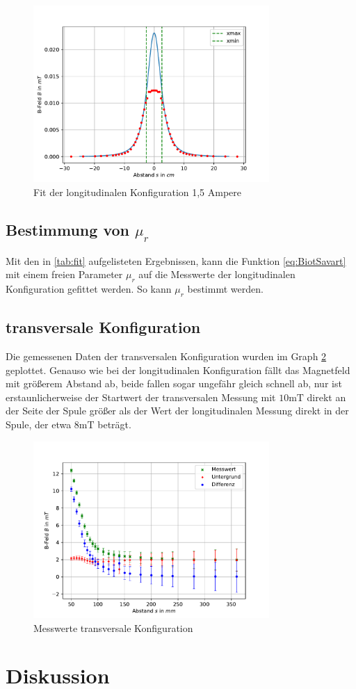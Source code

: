 \documentclass[11pt, a4paper]{article}
\begin{document}
    \begin{figure}
        \centering
        \includegraphics[width=0.8\textwidth]{fit15a.pdf}
        \caption{Fit der longitudinalen Konfiguration 1,5 Ampere}
        \label{fig:longfit15a}
    \end{figure}

    \subsection{Bestimmung von $\mu_r$}
    Mit den in \ref{tab:fit} aufgelisteten Ergebnissen, kann die Funktion \ref{eq:BiotSavart} mit einem freien Parameter $\mu_r$ auf die Messwerte der longitudinalen Konfiguration gefittet werden. So kann $\mu_r$ bestimmt werden.


    \subsection{transversale Konfiguration}
    Die gemessenen Daten der transversalen Konfiguration wurden im Graph \ref{fig:transmess} geplottet.
    Genauso wie bei der longitudinalen Konfiguration fällt das Magnetfeld mit größerem Abstand ab, beide fallen sogar ungefähr gleich schnell ab, nur ist erstaunlicherweise der Startwert der transversalen Messung mit $10 \si{\milli\tesla}$ direkt an der Seite der Spule größer als der Wert der longitudinalen Messung direkt in der Spule, der etwa $8 \si{\milli\tesla}$ beträgt.
    \begin{figure}[h]
        \centering
        \includegraphics[width=0.8\textwidth]{raw2.pdf}
        \caption{Messwerte transversale Konfiguration}
        \label{fig:transmess}
    \end{figure}


    \section{Diskussion}

    
    
\end{document}
